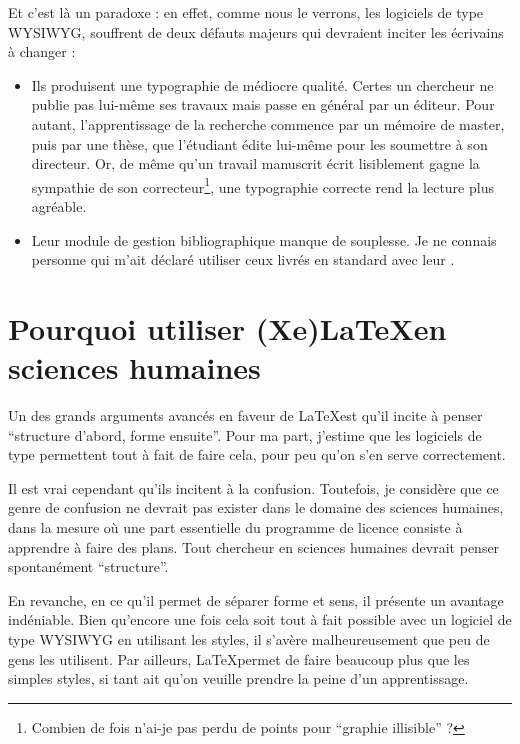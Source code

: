 Et c'est là un paradoxe : en effet, comme nous le verrons, les logiciels de type WYSIWYG, souffrent de deux défauts majeurs qui devraient inciter les écrivains à changer :
\begin{itemize}
\item Ils produisent une typographie de médiocre qualité. Certes un chercheur ne publie pas lui-même ses travaux mais passe en général par un éditeur. Pour autant, l'apprentissage de la recherche commence par un mémoire de master, puis par une thèse, que l'étudiant édite lui-même pour les soumettre à son directeur. Or, de même qu'un travail manuscrit écrit lisiblement gagne la sympathie de son correcteur\footnote{Combien de fois n'ai-je pas perdu de points pour \enquote{graphie illisible} ?},  une typographie correcte rend la lecture plus agréable.
\item Leur module de gestion bibliographique manque de souplesse. Je ne connais personne qui m'ait déclaré utiliser ceux livrés en standard avec leur .
\end{itemize}

\section{Pourquoi utiliser (Xe)\LaTeX en sciences humaines}

Un des grands arguments avancés en faveur de \LaTeX est qu'il incite à penser \enquote{structure d'abord, forme ensuite}. Pour ma part, j'estime que les logiciels de type  permettent tout à fait de faire cela, pour peu qu'on s'en serve correctement. 

Il est vrai cependant qu'ils incitent à la confusion. Toutefois, je considère que ce genre de confusion ne devrait pas exister dans le domaine des sciences humaines, dans la mesure où une part essentielle du programme de licence consiste à apprendre à faire des plans. Tout chercheur en sciences humaines devrait penser spontanément \enquote{structure}.

En revanche, en ce qu'il permet de séparer forme et sens, il présente un avantage indéniable. Bien qu'encore une fois cela soit tout à fait possible avec un logiciel de type WYSIWYG en utilisant les styles,  il s'avère malheureusement que peu de gens les utilisent. Par ailleurs, \LaTeX permet de faire beaucoup plus que les simples styles, si tant ait qu'on veuille prendre la peine d'un apprentissage.

